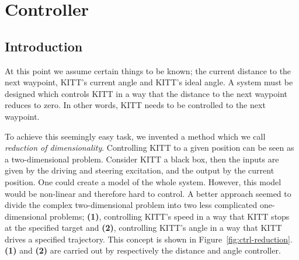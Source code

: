 \documentclass[11pt,titlepage]{report}
\begin{document}
\chapter{Controller}
\label{ch:control}
\section{Introduction}
At this point we assume certain things to be known; the current distance to the next waypoint, KITT's current angle and KITT's ideal angle. A system must be designed which controls KITT in a way that the distance to the next waypoint reduces to zero. In other words, KITT needs to be controlled to the next waypoint.

To achieve this seemingly easy task, we invented a method which we call \textit{reduction of dimensionality}. Controlling KITT to a given position can be seen as a two-dimensional problem. Consider KITT a black box, then the inputs are given by the driving and steering excitation, and the output by the current position. One could create a model of the whole system. However, this model would be non-linear and therefore hard to control. A better approach seemed to divide the complex two-dimensional problem into two less complicated one-dimensional problems; \textbf{(1)}, controlling KITT's speed in a way that KITT stops at the specified target and \textbf{(2)}, controlling KITT's angle in a way that KITT drives a specified trajectory. This concept is shown in Figure~\ref{fig:ctrl-reduction}. \textbf{(1)} and \textbf{(2)} are carried out by respectively the distance and angle controller. 
\end{document}
